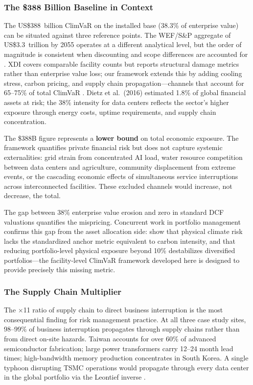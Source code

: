 \begin{twocolbody}

\subsubsection*{The \$388 Billion Baseline in Context}

\noindent The US\$388~billion ClimVaR on the installed base (38.3\% of enterprise value) can be situated against three reference points. The WEF/S\&P aggregate of US\$3.3~trillion by 2055 operates at a different analytical level, but the order of magnitude is consistent when discounting and scope differences are accounted for \citep{wef2025}. XDI covers comparable facility counts but reports structural damage metrics rather than enterprise value loss; our framework extends this by adding cooling stress, carbon pricing, and supply chain propagation---channels that account for 65--75\% of total ClimVaR \citep{xdi2025}. Dietz et al.\ (2016) estimated 1.8\% of global financial assets at risk; the 38\% intensity for data centers reflects the sector's higher exposure through energy costs, uptime requirements, and supply chain concentration.

The \$388B figure represents a \textbf{lower bound} on total economic exposure. The framework quantifies private financial risk but does not capture systemic externalities: grid strain from concentrated AI load, water resource competition between data centers and agriculture, community displacement from extreme events, or the cascading economic effects of simultaneous service interruptions across interconnected facilities. These excluded channels would increase, not decrease, the total.

The gap between 38\% enterprise value erosion and zero in standard DCF valuations quantifies the mispricing. Concurrent work in portfolio management confirms this gap from the asset allocation side: \citet{luciani2026} show that physical climate risk lacks the standardized anchor metric equivalent to carbon intensity, and that reducing portfolio-level physical exposure beyond 10\% destabilizes diversified portfolios---the facility-level ClimVaR framework developed here is designed to provide precisely this missing metric.

\subsubsection*{The Supply Chain Multiplier}

The $\times$11 ratio of supply chain to direct business interruption is the most consequential finding for risk management practice. At all three case study sites, 98--99\% of business interruption propagates through supply chains rather than from direct on-site hazards. Taiwan accounts for over 60\% of advanced semiconductor fabrication; large power transformers carry 12--24 month lead times; high-bandwidth memory production concentrates in South Korea. A single typhoon disrupting TSMC operations would propagate through every data center in the global portfolio via the Leontief inverse \citep{verdantix2024}.


\end{twocolbody}
